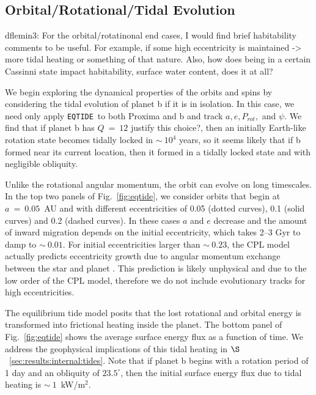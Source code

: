 \documentclass[preprint,12pt]{aastex}
\newcommand{\xxx}[1]{{\color{red} #1}} %
\def\eqtide{\texttt{\footnotesize{EQTIDE}}\xspace}
\begin{document}
\subsection{Orbital/Rotational/Tidal Evolution}
\label{sec:results:orbital}

\xxx{dflemin3: For the orbital/rotatinonal end cases, I would find brief habitability comments to be useful.  For example,
if some high eccentricity is maintained -> more tidal heating or something of that nature.  Also, how does being in a certain
Cassinni state impact habitability, surface water content, does it at all?}

We begin exploring the dynamical properties of the orbits and spins by
considering the tidal evolution of planet b if it is in isolation. In
this case, we need only apply \eqtide~to both Proxima and b and track
$a, e, P_{rot},$ and $\psi$. We find that if planet b has $Q~=~12$ \xxx{justify this choice?},
then an initially Earth-like rotation state becomes tidally locked in
$\sim~10^4$ years, so it seems likely that if b formed near its
current location, then it formed in a tidally locked state and with
negligible obliquity.

Unlike the rotational angular momentum, the orbit can evolve on long
timescales. In the top two panels of Fig.~\ref{fig:eqtide}, we
consider orbits that begin at $a~=~0.05$~AU and with different
eccentricities of 0.05 (dotted curves), 0.1 (solid curves) and 0.2
(dashed curves). In these cases $a$ and $e$ decrease and the amount of
inward migration depends on the initial eccentricity, which takes 2--3
Gyr to damp to $\sim~0.01$. For initial eccentricities larger than
$\sim~0.23$, the CPL model actually predicts eccentricity growth due
to angular momentum exchange between the star and planet
\citep{Barnes16}. This prediction is likely unphysical and due to the
low order of the CPL model, therefore we do not include evolutionary
tracks for high eccentricities.

The equilibrium tide model posits that the lost rotational and orbital
energy is transformed into frictional heating inside the planet. The
bottom panel of Fig.~\ref{fig:eqtide} shows the average surface energy
flux as a function of time. We address the geophysical implications of
this tidal heating in $\S$~\ref{sec:results:internal:tides}. Note that if planet
b begins with a rotation period of 1 day and an obliquity of
$23.5^\circ$, then the initial surface energy flux due to tidal
heating is $\sim~1$~kW/m$^{2}$.
\end{document}
